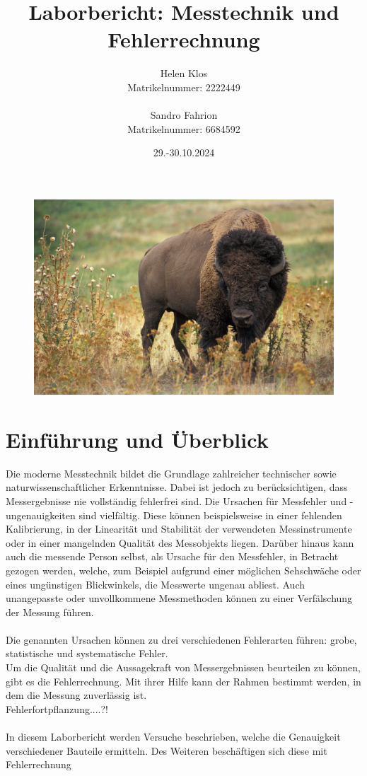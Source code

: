 \documentclass[a4paper,12pt]{article}
\title{Laborbericht: Messtechnik und Fehlerrechnung}
\author{Helen Klos \\Matrikelnummer: 2222449 \\ \\Sandro Fahrion \\Matrikelnummer: 6684592}
\date{29.-30.10.2024}
\begin{document}
\sloppy
\setlength{\emergencystretch}{5pt}
\maketitle

\begin{figure}[H]
    \centering
    \includegraphics[width=1.0\textwidth]{../Quellen/Labor2/Titelbild.jpg}
\end{figure}
\newpage
\tableofcontents
\newpage

\section*{Einführung und Überblick}
Die moderne Messtechnik bildet die Grundlage zahlreicher technischer sowie naturwissenschaftlicher Erkenntnisse. Dabei ist jedoch zu berücksichtigen, dass Messergebnisse nie vollständig fehlerfrei sind. Die Ursachen für Messfehler und -ungenauigkeiten sind vielfältig. Diese können beispielsweise in einer fehlenden Kalibrierung, in der Linearität und Stabilität der verwendeten Messinstrumente oder in einer mangelnden Qualität des Messobjekts liegen. Darüber hinaus kann auch die messende Person selbst, als Ursache für den Messfehler, in Betracht gezogen werden, welche, zum Beispiel aufgrund einer möglichen Sehschwäche oder eines ungünstigen Blickwinkels, die Messwerte ungenau abliest. Auch unangepasste oder unvollkommene Messmethoden können zu einer Verfälschung der Messung führen.\\\\
Die genannten Ursachen können zu drei verschiedenen Fehlerarten führen: grobe, statistische und systematische Fehler.\\
Um die Qualität und die Aussagekraft von Messergebnissen beurteilen zu können, gibt es die Fehlerrechnung. Mit ihrer Hilfe kann der Rahmen bestimmt werden, in dem die Messung zuverlässig ist.\\
Fehlerfortpflanzung....?!\\\\
\noindent In diesem Laborbericht werden Versuche beschrieben, welche die Genauigkeit verschiedener Bauteile ermitteln. Des Weiteren beschäftigen sich diese mit Fehlerrechnung
\end{document}
